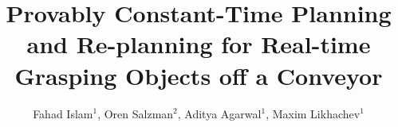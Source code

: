 \documentclass[conference]{IEEEtran}
\begin{document}
\title{Provably Constant-Time Planning and Re-planning for Real-time Grasping Objects off a Conveyor}


\author{ Fahad Islam$^{1}$,
  Oren Salzman$^{2}$,
  Aditya Agarwal$^{1}$,
  Maxim Likhachev$^{1}$\\
    }





% 
\end{document}
